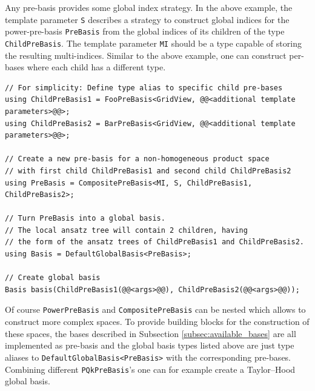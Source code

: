 \documentclass[a4paper,10pt,headings=normal,bibliography=totoc]{scrartcl}
\newcommand{\cpp}[1]{\lstinline[basicstyle=\ttfamily]!#1!}
\begin{document}
Any pre-basis provides some global index strategy. In the
above example, the template parameter \cpp{S} describes
a strategy to construct global indices for the power-pre-basis
\cpp{PreBasis} from the global indices of its children
of the type \cpp{ChildPreBasis}. The template parameter
\cpp{MI} should be a type capable of storing the resulting
multi-indices. Similar to the above example, one can construct
per-bases where each child has a different type.

\begin{lstlisting}[style=Example]
// For simplicity: Define type alias to specific child pre-bases
using ChildPreBasis1 = FooPreBasis<GridView, @@<additional template parameters>@@>;
using ChildPreBasis2 = BarPreBasis<GridView, @@<additional template parameters>@@>;

// Create a new pre-basis for a non-homogeneous product space
// with first child ChildPreBasis1 and second child ChildPreBasis2
using PreBasis = CompositePreBasis<MI, S, ChildPreBasis1, ChildPreBasis2>;

// Turn PreBasis into a global basis.
// The local ansatz tree will contain 2 children, having
// the form of the ansatz trees of ChildPreBasis1 and ChildPreBasis2.
using Basis = DefaultGlobalBasis<PreBasis>;

// Create global basis
Basis basis(ChildPreBasis1(@@<args>@@), ChildPreBasis2(@@<args>@@));
\end{lstlisting}

Of course \cpp{PowerPreBasis} and \cpp{CompositePreBasis}
can be nested which allows to construct more complex spaces.
To provide building blocks for the construction of these spaces, the bases
described in Subsection \ref{subsec:available_bases} are
all implemented as pre-basis and the global basis types
listed above are just type aliases to \cpp{DefaultGlobalBasis<PreBasis>}
with the corresponding pre-bases.
Combining different \cpp{PQkPreBasis}'s one can for
example create a Taylor--Hood global basis.
\end{document}
